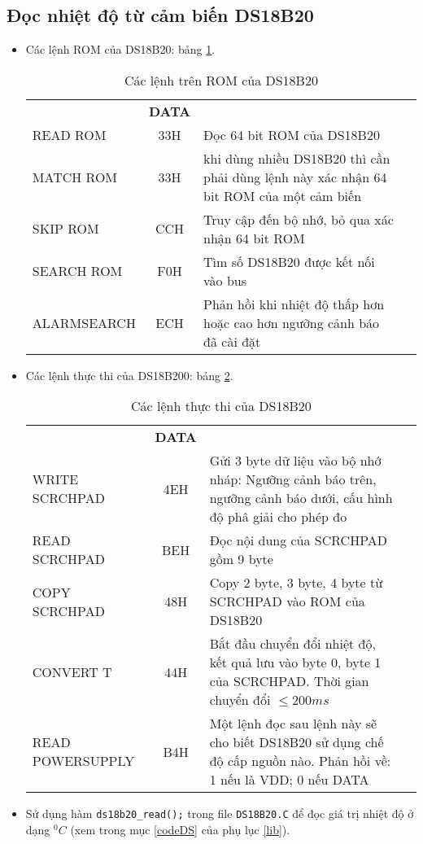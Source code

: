 \subsection{Đọc nhiệt độ từ cảm biến DS18B20}
\begin{itemize}
\item Các lệnh ROM của DS18B20: bảng \ref{Tab:lenh-ROM-DS18B20}.
\begin{table}[!h]
\begin{center}
\begin{tabular}{|l|c|p{9cm}|l}\cline{1-3}
\centering{\textbf{Tên lệnh}} & \textbf{DATA} & \centering{\textbf{Chức năng}} & \\ \cline{1-3}
READ ROM & 33H & Đọc 64 bit ROM của DS18B20 \\ \cline{1-3}
MATCH ROM & 33H & khi dùng nhiều DS18B20 thì cần phải dùng lệnh này xác nhận 64 bit ROM của một cảm biến& \\ \cline{1-3}
SKIP ROM & CCH & Truy cập đến bộ nhớ, bỏ qua xác nhận 64 bit ROM & \\ \cline{1-3}
SEARCH ROM & F0H & Tìm số DS18B20 được kết nối vào bus& \\ \cline{1-3}
ALARMSEARCH & ECH & Phản hồi khi nhiệt độ thấp hơn hoặc cao hơn ngưỡng cảnh báo đã cài đặt & \\ \cline{1-3}
\end{tabular}
\end{center}
\caption{Các lệnh trên ROM của DS18B20} \label{Tab:lenh-ROM-DS18B20}
\end{table}
\item Các lệnh thực thi của DS18B200: bảng \ref{Tab:lenh-thuc-thi-DS18B20}.
\begin{table}[!h]
\begin{center}
\begin{tabular}{|l|c|p{9cm}|l}\cline{1-3}
\centering{\textbf{Tên lệnh}} & \textbf{DATA} & \centering{\textbf{Chức năng}} & \\ \cline{1-3}
WRITE SCRCHPAD & 4EH & Gửi 3 byte dữ liệu vào bộ nhớ nháp: Ngưỡng cảnh báo trên, ngưỡng cảnh báo dưới, cấu hình độ phâ giải cho phép đo & \\ \cline{1-3}
READ SCRCHPAD & BEH & Đọc nội dung của SCRCHPAD gồm 9 byte & \\ \cline{1-3}
COPY SCRCHPAD & 48H & Copy 2 byte, 3 byte, 4 byte từ SCRCHPAD vào ROM của DS18B20 & \\ \cline{1-3}
CONVERT T & 44H & Bắt đầu chuyển đổi nhiệt độ, kết quả lưu vào byte 0, byte 1 của SCRCHPAD. Thời gian chuyển đổi $\leq 200ms$& \\ \cline{1-3}
READ POWERSUPPLY & B4H & Một lệnh đọc sau lệnh này sẽ cho biết DS18B20 sử dụng chế độ cấp nguồn nào. Phản hồi về: 1 nếu là VDD; 0 nếu DATA & \\ \cline{1-3}
\end{tabular}
\end{center}
\caption{Các lệnh thực thi của DS18B20}\label{Tab:lenh-thuc-thi-DS18B20}
\end{table}
\item Sử dụng hàm \verb|ds18b20_read();| trong file \verb|DS18B20.C| để đọc giá trị nhiệt độ ở dạng $^0C$ (xem trong mục \ref{codeDS} của phụ lục \ref{lib}).
\end{itemize}
